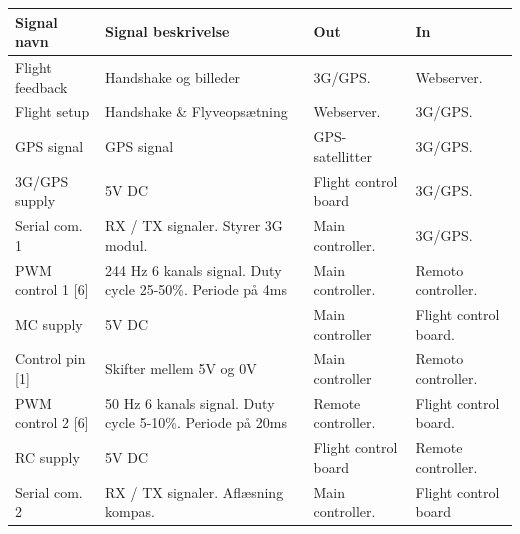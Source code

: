 \begin{table}[H]
	\centering
		\begin{tabular}{|p{3.1 cm}|p{4.9 cm}|p{2.3 cm}|p{2.3 cm}|}  
		
		\hline
			\textbf{Signal navn} 	& \textbf{Signal beskrivelse}		& \textbf{Out} 		& \textbf{In}     \\ \hline
			Flight feedback		& Handshake og billeder				& 3G/GPS.				& Webserver.	\\ \hline
			Flight setup		& Handshake \& \newline Flyveopsætning  		& Webserver.			& 3G/GPS.	\\ \hline
			GPS signal	 		& GPS signal						& GPS-satellitter		& 3G/GPS.	\\ \hline			
			3G/GPS supply		& 5V DC							 	& Flight control board	& 3G/GPS.    \\ \hline
			Serial com. 1		& RX / TX signaler. \newline Styrer 3G modul.& Main \newline controller. 		& 3G/GPS.    \\ \hline
			
			
			PWM control 1 [6]	& 244 Hz 6 kanals signal. Duty cycle 25-50\%. Periode på 4ms	& Main \newline controller.	& Remoto \newline controller.	\\ \hline
			MC supply		& 5V DC							 	& Main \newline controller	& Flight control board.    \\ \hline
			Control pin [1]		& Skifter mellem 5V og 0V							 	& Main \newline controller	& Remoto \newline  controller.    \\ \hline
			
			PWM control 2 [6]	& 50 Hz 6 kanals signal. Duty cycle 5-10\%. Periode på 20ms	& Remote \newline controller.	& Flight control board.	\\ \hline		RC supply			& 5V DC							 	& Flight control board	& Remote \newline controller.    \\ \hline
			Serial com. 2		& RX / TX signaler. \newline Aflæsning kompas. & Main \newline controller.	& Flight control board	\\ \hline 	
			

\end{tabular}
\end{table}
